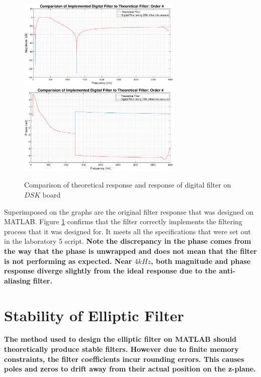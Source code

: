 \documentclass{article}
\begin{document}
\begin{figure}[H]
    \centering
    \includegraphics[width = 0.70\textwidth]{band_pass_mag_compare}
    \includegraphics[width = 0.70\textwidth]{band_pass_phase_compare}
    \caption{Comparison of theoretical response and response of digital filter on $DSK$ board}
    \label{fig:bandpass_freq}
\end{figure}

 Superimposed on the graphs are the original filter response that was designed on MATLAB. Figure \ref{fig:bandpass_freq} confirms that the filter correctly implements the filtering process that it was designed for. It meets all the specifications that were set out in the laboratory 5 script.\textbf{ Note the discrepancy in the phase comes from the way that the phase is unwrapped and does not mean that the filter is not performing as expected. Near $4kHz$, both magnitude and phase response diverge slightly from the ideal response due to the anti-aliasing filter.}
 
\section{Stability of Elliptic Filter}

\textbf{The method used to design the elliptic filter on MATLAB should theoretically produce stable filters. However due to finite memory constraints, the filter coefficients incur rounding errors. This causes poles and zeros to drift away from their actual position on the z-plane.}\\
\end{document}
